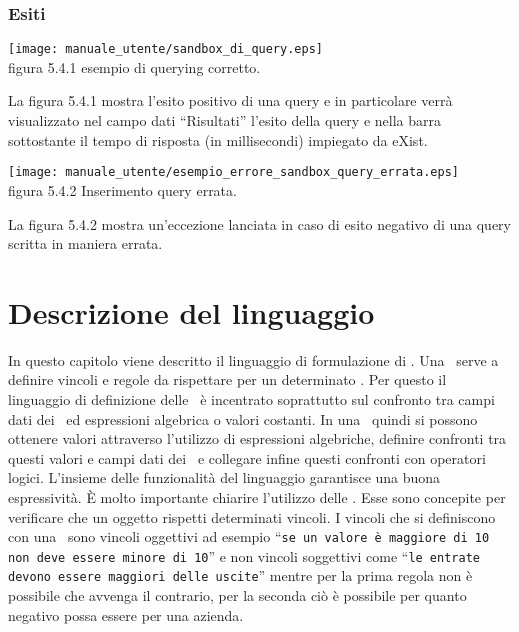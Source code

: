 \subsection{Esiti}
\begin{center}
\texttt{[image: manuale\_utente/sandbox\_di\_query.eps]}\\
 figura 5.4.1 esempio di querying corretto.
\end{center}
La figura 5.4.1 mostra l'esito positivo di una query e in particolare verr\`a visualizzato nel campo dati ``Risultati'' l'esito della query e nella barra sottostante il tempo di risposta (in millisecondi) impiegato da eXist.

\begin{center}
\texttt{[image: manuale\_utente/esempio\_errore\_sandbox\_query\_errata.eps]}\\
figura 5.4.2 Inserimento query errata.
\end{center}
La figura 5.4.2 mostra un'eccezione lanciata in caso di esito negativo di una query scritta in maniera errata.


\chapter{Descrizione del linguaggio}
In questo capitolo viene descritto il linguaggio di formulazione di \br. Una \br\ serve a definire vincoli e regole da rispettare per un determinato \bo. Per questo il linguaggio di definizione delle \br\ \`e incentrato soprattutto sul confronto tra campi dati dei \bo\ ed espressioni algebrica o valori costanti. In una \br\ quindi si possono ottenere valori attraverso l'utilizzo di espressioni algebriche, definire confronti tra questi valori e campi dati dei \bo\ e collegare infine questi confronti con operatori logici. L'insieme delle funzionalit\`a del linguaggio garantisce una buona espressivit\`a.
\`E molto importante chiarire l'utilizzo delle \br. Esse sono concepite per verificare che un oggetto rispetti determinati vincoli. I vincoli che si definiscono con una \br\ sono vincoli oggettivi ad esempio ``\texttt{se un valore è maggiore di 10 non deve essere minore di 10}'' e non vincoli soggettivi come ``\texttt{le entrate devono essere maggiori delle uscite}'' mentre per la prima regola non \`e possibile che avvenga il contrario, per la seconda ci\`o \`e possibile per quanto negativo possa essere per una azienda.

